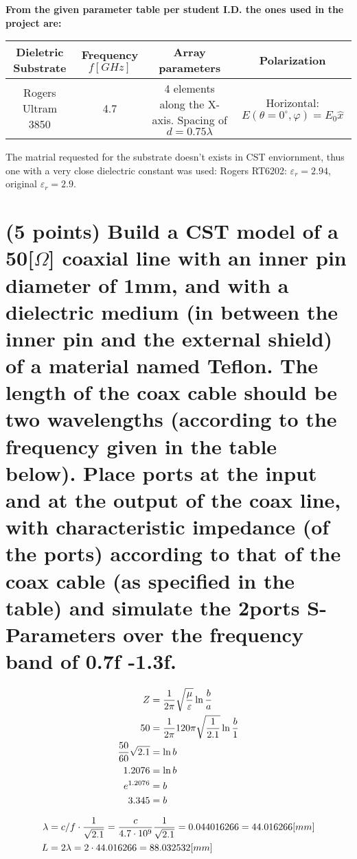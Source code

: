 \documentclass[12pt, letterpaper]{article}
\begin{document}
\textbf{From the given parameter table per student I.D. the ones used in the project are:}

\vspace{2em}
\begin{tabular}{| c | c | c | c |}
  \hline
  Dieletric Substrate & Frequency $f[GHz]$ & Array parameters & Polarization\\
  \hline
  Rogers Ultram 3850 & 4.7 & \shortstack{4 elements along the X-axis.\\ Spacing of $d=0.75\lambda$} &  \shortstack{Horizontal:\\ $E(\theta=0^{\circ},\varphi)=E_0\hat{x}$}\\
  \hline
\end{tabular}

\vspace{1em}
{\color{blue}The matrial requested for the substrate doesn't exists in CST enviornment, thus one with a very close dielectric constant was used: Rogers RT6202: $\varepsilon_r=2.94$, original $\varepsilon_r=2.9$.}

\pagebreak

\section{(5 points) Build a CST model of a 50[$\Omega$] coaxial line with an inner pin diameter of 1mm, and with a dielectric medium (in between the inner pin and the external shield) of a material named Teflon. The length of the coax cable should be two wavelengths (according to the frequency given in the table below). Place ports at the input and at the output of the coax line, with characteristic impedance (of the ports) according to that of the coax cable (as specified in the table) and simulate the 2ports S-Parameters over the frequency band of 0.7f -1.3f.}

\begin{align}
  Z &=
  {1\over2\pi}
  \sqrt{\mu\over\varepsilon}
  \ln{b\over a}
  \\
  50
  &=
  {1\over2\pi}
  120\pi
  \sqrt{1\over2.1}
  \ln{b\over 1}
  \\
  {
    50
    \over
    60
  }
  \sqrt{2.1}
  &=
  \ln{b}
  \\
  1.2076
  &=
  \ln{b}
  \\
  e^{1.2076}
  &=
  {b}
  \\
  3.345
  &=
  b
\end{align}

\begin{align}
  \lambda
  &=
  c/f\cdot{1\over\sqrt{2.1}}
  =
  {c\over 4.7\cdot10^9}{1\over\sqrt{2.1}}
  =
  0.044016266
  =
  44.016266[mm]
  \\
  L&=
  2\lambda=
  2\cdot44.016266
  =
  88.032532[mm]
\end{align}
\end{document}
